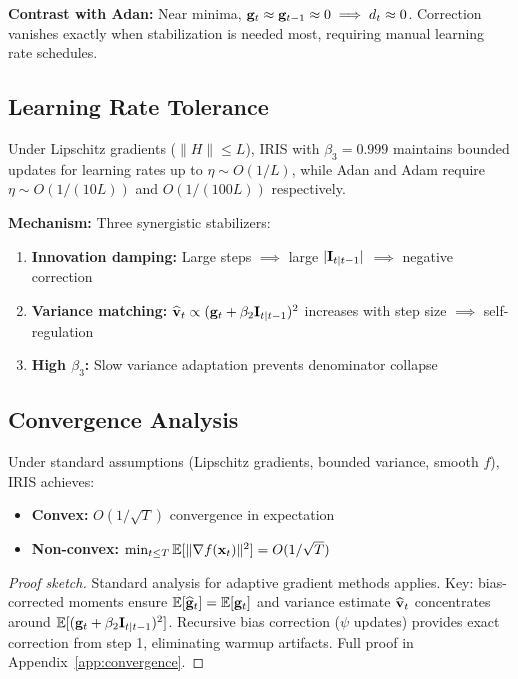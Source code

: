 \textbf{Contrast with Adan:} Near minima, $\mathbf{g}_t \approx \mathbf{g}_{t-1} \approx 0 \implies d_t \approx 0$. Correction vanishes exactly when stabilization is needed most, requiring manual learning rate schedules.

\subsection{Learning Rate Tolerance}

\begin{proposition}
\label{prop:lr_tolerance}
Under Lipschitz gradients ($\|H\| \leq L$), IRIS with $\beta_3 = 0.999$ maintains bounded updates for learning rates up to $\eta \sim O(1/L)$, while Adan and Adam require $\eta \sim O(1/(10L))$ and $O(1/(100L))$ respectively.
\end{proposition}

\textbf{Mechanism:} Three synergistic stabilizers:
\begin{enumerate}
    \item \textbf{Innovation damping:} Large steps $\implies$ large $|\mathbf{I}_{t|t-1}|$ $\implies$ negative correction
    \item \textbf{Variance matching:} $\widehat{\mathbf{v}}_t \propto (\mathbf{g}_t + \beta_2 \mathbf{I}_{t|t-1})^2$ increases with step size $\implies$ self-regulation
    \item \textbf{High $\beta_3$:} Slow variance adaptation prevents denominator collapse
\end{enumerate}

\subsection{Convergence Analysis}
\begin{theorem}
\label{thm:convergence}
Under standard assumptions (Lipschitz gradients, bounded variance, smooth $f$), IRIS achieves:
\begin{itemize}
    \item \textbf{Convex:} $O(1/\sqrt{T})$ convergence in expectation
    \item \textbf{Non-convex:} $\min_{t \leq T} \mathbb{E}[\|\nabla f(\mathbf{x}_t)\|^2] = O(1/\sqrt{T})$
\end{itemize}
\end{theorem}

\begin{proof}[Proof sketch]
Standard analysis for adaptive gradient methods applies. Key: bias-corrected moments ensure $\mathbb{E}[\widehat{\mathbf{g}}_t] = \mathbb{E}[\mathbf{g}_t]$ and variance estimate $\widehat{\mathbf{v}}_t$ concentrates around $\mathbb{E}[(\mathbf{g}_t + \beta_2 \mathbf{I}_{t|t-1})^2]$. Recursive bias correction ($\psi$ updates) provides exact correction from step 1, eliminating warmup artifacts. Full proof in Appendix~\ref{app:convergence}.
\end{proof}
